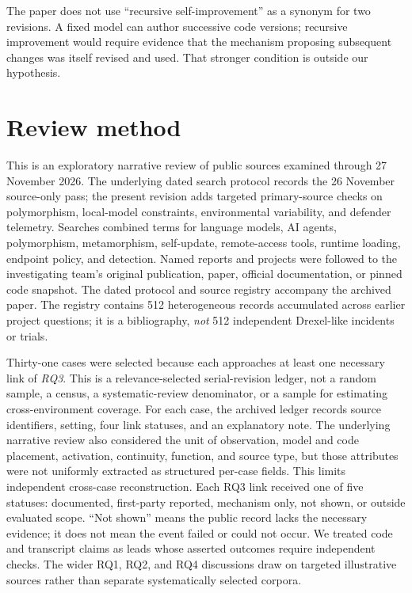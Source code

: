 \documentclass[11pt,letterpaper]{article}
\begin{document}
The paper does not use ``recursive self-improvement'' as a synonym for two revisions. A fixed model can author successive code versions; recursive improvement would require evidence that the mechanism proposing subsequent changes was itself revised and used. That stronger condition is outside our hypothesis.

\section{Review method}\label{sec:method}

This is an exploratory narrative review of public sources examined through 27 November 2026. The underlying dated search protocol records the 26 November source-only pass; the present revision adds targeted primary-source checks on polymorphism, local-model constraints, environmental variability, and defender telemetry. Searches combined terms for language models, AI agents, polymorphism, metamorphism, self-update, remote-access tools, runtime loading, endpoint policy, and detection. Named reports and projects were followed to the investigating team's original publication, paper, official documentation, or pinned code snapshot. The dated protocol and source registry accompany the archived paper. The registry contains 512 heterogeneous records accumulated across earlier project questions; it is a bibliography, \emph{not} 512 independent Drexel-like incidents or trials.

Thirty-one cases were selected because each approaches at least one necessary link of \emph{RQ3}. This is a relevance-selected serial-revision ledger, not a random sample, a census, a systematic-review denominator, or a sample for estimating cross-environment coverage. For each case, the archived ledger records source identifiers, setting, four link statuses, and an explanatory note. The underlying narrative review also considered the unit of observation, model and code placement, activation, continuity, function, and source type, but those attributes were not uniformly extracted as structured per-case fields. This limits independent cross-case reconstruction. Each RQ3 link received one of five statuses: documented, first-party reported, mechanism only, not shown, or outside evaluated scope. ``Not shown'' means the public record lacks the necessary evidence; it does not mean the event failed or could not occur. We treated code and transcript claims as leads whose asserted outcomes require independent checks. The wider RQ1, RQ2, and RQ4 discussions draw on targeted illustrative sources rather than separate systematically selected corpora.
\end{document}
